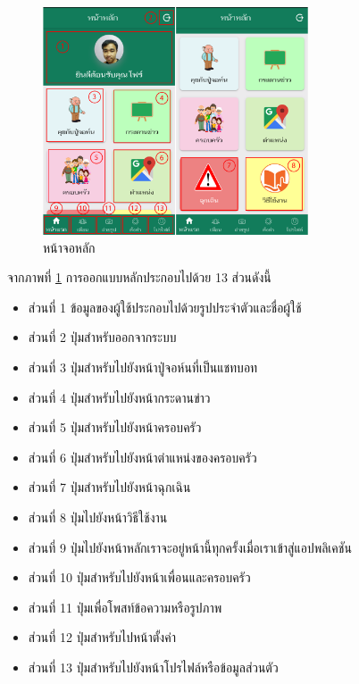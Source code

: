 		\begin{figure}[H]
			\centering
			\includegraphics[width=0.7\textwidth]{Figures/3/UI/main}
			\caption{หน้าจอหลัก}
			\label{Fig:หน้าจอหลัก}
		\end{figure}
		จากภาพที่ \ref{Fig:หน้าจอหลัก} การออกแบบหลักประกอบไปด้วย 13 ส่วนดังนี้
		\begin{itemize}
			\item ส่วนที่ 1 ข้อมูลของผู้ใช้ประกอบไปด้วยรูปประจำตัวและชื่อผู้ใช้
			\item ส่วนที่ 2 ปุ่มสำหรับออกจากระบบ
			\item ส่วนที่ 3 ปุ่มสำหรับไปยังหน้าปู่จอห์นที่เป็นแชทบอท
			\item ส่วนที่ 4 ปุ่มสำหรับไปยังหน้ากระดานข่าว
			\item ส่วนที่ 5 ปุ่มสำหรับไปยังหน้าครอบครัว
			\item ส่วนที่ 6 ปุ่มสำหรับไปยังหน้าตำแหน่งของครอบครัว
			\item ส่วนที่ 7 ปุ่มสำหรับไปยังหน้าฉุกเฉิน
			\item ส่วนที่ 8 ปุ่มไปยังหน้าวิธีใช้งาน
			\item ส่วนที่ 9 ปุ่มไปยังหน้าหลักเราจะอยู่หน้านี้ทุกครั้งเมื่อเราเข้าสู่แอปพลิเคชัน
			\item ส่วนที่ 10 ปุ่มสำหรับไปยังหน้าเพื่อนและครอบครัว
			\item ส่วนที่ 11 ปุ่มเพื่อโพสท์ข้อความหรือรูปภาพ
			\item ส่วนที่ 12 ปุ่มสำหรับไปหน้าตั้งค่า
			\item ส่วนที่ 13 ปุ่มสำหรับไปยังหน้าโปรไฟล์หรือข้อมูลส่วนตัว
		\end{itemize}

